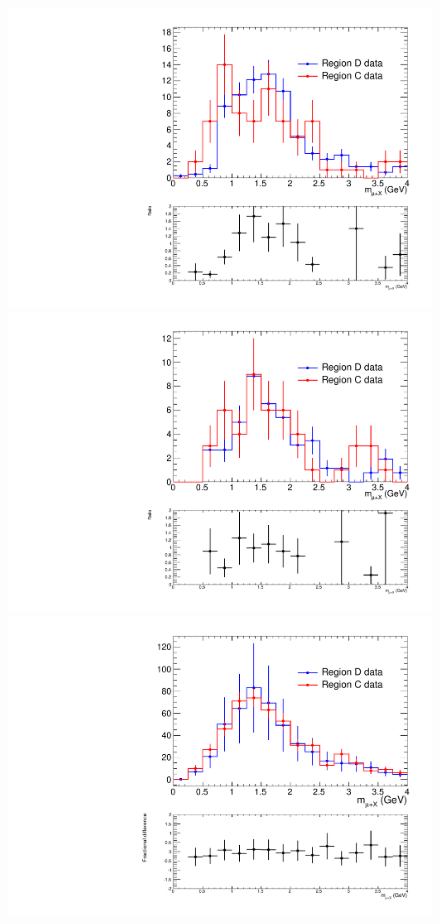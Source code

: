 \begin{figure}[hbtp]
  \begin{center}
    \includegraphics[width=\cmsFigWidth]{figures/muHadMassCanvas_regCDataVsRegDData_HLT_IsoMu24_eta2p1_lowMT}
    \includegraphics[width=\cmsFigWidth]{figures/muHadMassCanvas_regCDataVsRegDData_HLT_IsoMu24_eta2p1_highMT}
    \includegraphics[width=\cmsFigWidth]{figures/muHadMassCanvas_regCDataVsRegDData_Mu40_eta2p1_lowMT}

\end{center}
\end{figure}
